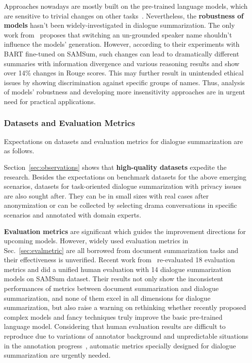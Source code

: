 Approaches nowadays are mostly built on the pre-trained language models, which are sensitive to trivial changes on other tasks~\cite{wang-etal-2022-rely,yan2022robustness}. 
Nevertheless, the \textbf{robustness of models} hasn't been widely-investigated in dialogue summarization. The only work from~\citet{jia2023reducing} proposes that switching an un-grounded speaker name shouldn't influence the models' generation. However, according to their experiments with BART fine-tuned on SAMSum, such changes can lead to dramatically different summaries with information divergence and various reasoning results and show over 14\% changes in Rouge scores. This may further result in unintended ethical issues by showing discrimination against specific groups of names. Thus, analysis of models' robustness and developing more insensitivity approaches are in urgent need for practical applications.


\subsubsection{Datasets and Evaluation Metrics}
Expectations on datasets and evaluation metrics for dialogue summarization are as follows.

Section~\ref{sec:observations} shows that \textbf{high-quality datasets} 
expedite the research. Besides the expectations on benchmark datasets for the above emerging scenarios, datasets for task-oriented dialogue summarization 
with privacy issues are also sought after. They can be in small sizes with 
real cases after anonymization or can be collected by selecting 
drama conversations in specific scenarios and annotated with 
domain experts. 

\textbf{Evaluation metrics} are significant which guides the improvement directions for upcoming models. However, 
widely used evaluation metrics in Sec.~\ref{sec:evalmetric} are all borrowed from document summarization 
tasks and their effectiveness is unverified. %
Recent work from~\citet{gao2022dialsummeval} re-evaluated 18 evaluation metrics and did a unified human evaluation with 14 dialogue summarization models on SAMSum dataset. 
Their results not only show the inconsistent performances of metrics between document summarization and dialogue summarization, and none of them excel in all dimensions for dialogue summarization, but also raise a warning on rethinking whether recently proposed complex models and fancy techniques truly improve the basic pre-trained language model.
Considering that human evaluation results are difficult to reproduce due to variations of annotator background and unpredictable situations in the annotation progress~\cite{clark2021all},
automatic metrics specially designed for dialogue summarization are 
urgently needed.

